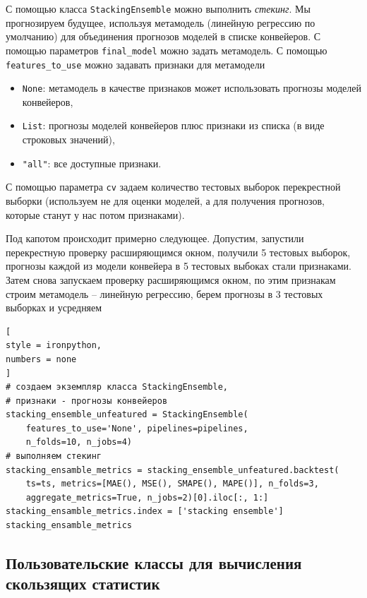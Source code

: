 \documentclass[%
	11pt,
	a4paper,
	utf8,
		]{article}
\begin{document}
С помощью класса \texttt{StackingEnsemble} можно выполнить \emph{стекинг}. Мы прогнозируем будущее, используя метамодель (линейную регрессию по умолчанию) для объединения прогнозов моделей в списке конвейеров. С помощью параметров \verb|final_model| можно задать метамодель. С помощью \verb|features_to_use| можно задавать признаки для метамодели
\begin{itemize}
	\item \texttt{None}: метамодель в качестве признаков может использовать прогнозы моделей конвейеров,
	
	\item \texttt{List}: прогнозы моделей конвейеров плюс признаки из списка (в виде строковых значений),
	
	\item \texttt{"all"}: все доступные признаки.
\end{itemize}

С помощью параметра \texttt{cv} задаем количество тестовых выборок перекрестной выборки (используем не для оценки моделей, а для получения прогнозов, которые станут у нас потом признаками).

Под капотом происходит примерно следующее. Допустим, запустили перекрестную проверку расширяющимся окном, получили 5 тестовых выборок, прогнозы каждой из модели конвейера в 5 тестовых выбоках стали признаками. Затем снова запускаем проверку расширяющимся окном, по этим признакам строим метамодель -- линейную регрессию, берем прогнозы в 3 тестовых выборках и усредняем
\begin{lstlisting}[
style = ironpython,
numbers = none
]
# создаем экземпляр класса StackingEnsemble,
# признаки - прогнозы конвейеров
stacking_ensemble_unfeatured = StackingEnsemble(
    features_to_use='None', pipelines=pipelines, 
    n_folds=10, n_jobs=4)
# выполняем стекинг
stacking_ensamble_metrics = stacking_ensemble_unfeatured.backtest(
    ts=ts, metrics=[MAE(), MSE(), SMAPE(), MAPE()], n_folds=3, 
    aggregate_metrics=True, n_jobs=2)[0].iloc[:, 1:]
stacking_ensamble_metrics.index = ['stacking ensemble']
stacking_ensamble_metrics
\end{lstlisting}

\subsection{Пользовательские классы для вычисления скользящих статистик}
\end{document}
